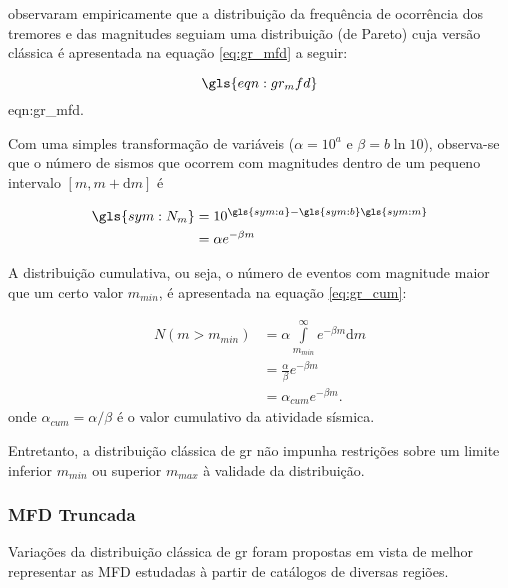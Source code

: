 \citet{gutenberg_1944} observaram empiricamente que a distribuição da frequência de ocorrência dos tremores e
das magnitudes seguiam uma distribuição (de Pareto) cuja versão clássica é apresentada na equação \eqref{eq:gr_mfd} a
seguir:

\begin{equation}
	\gls{eqn:gr_mfd}
	\label{eq:gr_mfd}
\end{equation}
\glsdesc*{eqn:gr_mfd}.

Com uma simples transformação de variáveis ($\alpha = 10^a$ e $\beta = b\ln{10}$), observa-se que o número de sismos que ocorrem
com magnitudes dentro de um pequeno intervalo $[m, m+\mathrm{d}m]$ é

\begin{equation}
	\begin{split}
		\gls{sym:N_m} &= 10^{\gls{sym:a} - \gls{sym:b}\gls{sym:m}} \\
					  &= \alpha e^{-\beta m}
	\end{split}
	\label{eq:gr_exp}
\end{equation}

A distribuição cumulativa, ou seja, o número de eventos com magnitude maior que um certo valor $m_{min}$, é apresentada
na equação \eqref{eq:gr_cum}:

\begin{equation}
	\begin{split}
		N(m > m_{min}) &= \alpha \int\limits_{m_{min}}^{\infty}e^{-\beta m}\mathrm{d}m \\
					   &= \frac{\alpha}{\beta} e^{-\beta m} \\
					   &= \alpha_{cum} e^{-\beta m}.
	\end{split}
	\label{eq:gr_cum}
\end{equation}
onde $\alpha_{cum} = \alpha / \beta $ é o valor cumulativo da atividade sísmica.


Entretanto, a distribuição clássica de \gls{gr} não impunha restrições sobre um limite inferior $m_{min}$
ou superior $m_{max}$ à validade da distribuição.



\subsubsection{MFD Truncada}
\label{sec:TMFD}

Variações da distribuição clássica de \gls{gr} foram propostas em vista de melhor representar as MFD estudadas à partir de
catálogos de diversas regiões.

